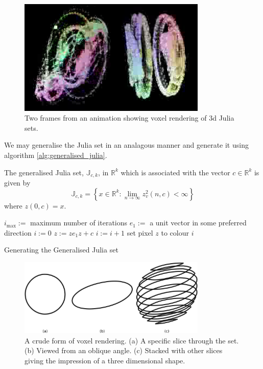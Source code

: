 \begin{figure}
\centering
\includegraphics[width=0.8\textwidth]{3djulia_pair}
\caption{\label{fig:3djulia}
  Two frames from an animation\cite{FRAC:JuliaAnimation} showing voxel
          rendering of 3d Julia sets.}
\end{figure}

We may generalise the Julia set in an analagous manner and generate it
using algorithm \ref{alg:generalised_julia}.

\begin{definition}
The generalised Julia set, $\mathbb{J}_{c,k}$, in $\mathbb{R}^k$
which is associated with the vector $c \in \mathbb{R}^k$ is given by
\[
\mathbb{J}_{c,k} = 
\left\{x \in \mathbb{R}^k
: \lim_{n \rightarrow \infty} z_v^2(n,c) < \infty \right\} 
\]
where $z(0,c) = x$.
\end{definition}

\begin{fancyalg}
\begin{algorithmic}[1]
\STATE $i_{\mathrm{max}} :=$ maximum number of iterations
\STATE $e_1 :=$ a unit vector in some preferred direction
\STATE $i := 0$
  \STATE $z := ze_1z + c$
  \STATE $i := i+1$
\ENDWHILE 
\STATE set pixel $z$ to colour $i$
\ENDFOR
\end{algorithmic}
\caption{
\label{alg:generalised_julia}
  Generating the Generalised Julia set}
\end{fancyalg}

\begin{figure}
\centering
\includegraphics[width=0.8\textwidth]{voxel}
\caption{\label{fig:voxel}
  A crude form of voxel rendering. (a) A specific slice through the set. (b) Viewed from
  an oblique angle. (c) Stacked with other slices giving the impression of a three
  dimensional shape.
}
\end{figure}

